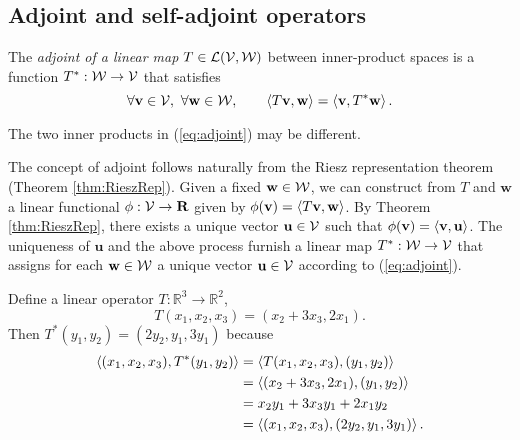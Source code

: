 \subsection{Adjoint and self-adjoint operators}

\begin{defn}
  \label{def:adjoint}
  The \emph{adjoint of a linear map}
  \mbox{$T\in {\cal L}({\cal V},{\cal W})$}
  between inner-product spaces is a function
  $T^*:{\cal W}\rightarrow{\cal V}$
  that satisfies
  \begin{equation}
    \label{eq:adjoint}
    \forall \mathbf{v}\in {\cal V},\ \forall \mathbf{w}\in {\cal W},
    \qquad \left\langle T\mathbf{v},\mathbf{w} \right\rangle = \left\langle \mathbf{v},T^*\mathbf{w} \right\rangle.
  \end{equation}
\end{defn}

\begin{rem}
  The two inner products in (\ref{eq:adjoint}) may be different.
\end{rem}

\begin{rem}
  The concept of adjoint follows naturally
  from the Riesz representation theorem (Theorem \ref{thm:RieszRep}).
  Given a fixed $\mathbf{w}\in {\cal W}$,
  we can construct from $T$ and $\mathbf{w}$ a linear functional
  $\phi: {\cal V}\rightarrow \mathbf{R}$
  given by $\phi(\mathbf{v}) = \left\langle T\mathbf{v},\mathbf{w} \right\rangle$.
  By Theorem \ref{thm:RieszRep},
  there exists a unique vector $\mathbf{u}\in{\cal V}$
  such that $\phi(\mathbf{v})=\left\langle \mathbf{v},\mathbf{u} \right\rangle$.
  The uniqueness of $\mathbf{u}$
  and the above process furnish a linear map
  $T^*:{\cal W}\rightarrow{\cal V}$
  that assigns for each $\mathbf{w}\in {\cal W}$
  a unique vector $\mathbf{u}\in {\cal V}$
  according to (\ref{eq:adjoint}).
\end{rem}

\begin{exm}
  Define a linear operator $T:\mathbb{R}^3\rightarrow \mathbb{R}^2$, 
  \begin{displaymath}
    T(x_1,x_2,x_3)=(x_2+3x_3,2x_1).
  \end{displaymath}
  Then $T^*(y_1,y_2)=(2y_2,y_1,3y_1)$ because
  \begin{align*}
    \left\langle (x_1,x_2,x_3), T^*(y_1,y_2) \right\rangle
    &= \left\langle T(x_1,x_2,x_3), (y_1,y_2) \right\rangle
    \\
    &= \left\langle (x_2+3x_3,2x_1), (y_1,y_2) \right\rangle
    \\
    &= x_2y_1+3x_3y_1+2x_1y_2
    \\
    &= \left\langle (x_1,x_2,x_3), (2y_2,y_1,3y_1) \right\rangle.
  \end{align*}
\end{exm}

